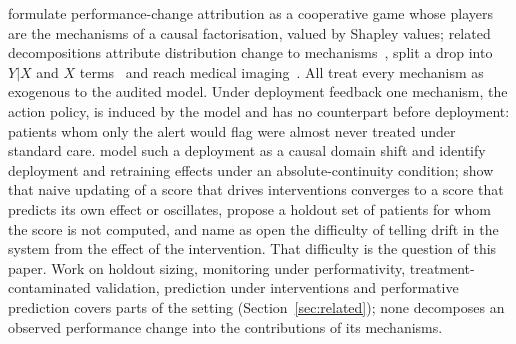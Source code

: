 \documentclass[letterpaper]{article} %
\begin{document}
\citet{zhang2023attributing} formulate performance-change attribution as a
cooperative game whose players are the mechanisms of a causal factorisation,
valued by Shapley values; related decompositions attribute distribution change
to mechanisms~\citep{budhathoki2021rootcauses}, split a drop into $Y|X$ and
$X$ terms~\citep{cai2023disde} and reach medical
imaging~\citep{gordaliza2025causal}. All treat every mechanism as exogenous to
the audited model. Under deployment feedback one mechanism, the action policy,
is induced by the model and has no counterpart before deployment: patients
whom only the alert would flag were almost never treated under standard care.
\citet{boeken2024evaluating} model such a deployment as a causal domain shift
and identify deployment and retraining effects under an absolute-continuity
condition; \citet{liley2021model} show that naive updating of a score that
drives interventions converges to a score that predicts its own effect or
oscillates, propose a holdout set of patients for whom the score is not
computed, and name as open the difficulty of telling drift in the system from
the effect of the intervention. That difficulty is the question of this
paper. Work on holdout sizing, monitoring under performativity,
treatment-contaminated validation, prediction under interventions and
performative prediction covers parts of the setting (Section~\ref{sec:related});
none decomposes an observed performance change into the contributions of its
mechanisms.
\end{document}

